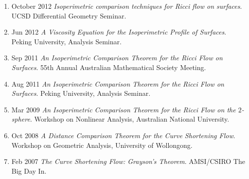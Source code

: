 \documentclass[12pt]{amsart}
\begin{document}
\begin{enumerate}[resume]
\item October 2012 \emph{Isoperimetric comparison techniques for Ricci flow on surfaces}. UCSD Differential Geometry Seminar.
\item Jun 2012 \emph{A Viscosity Equation for the Isoperimetric Profile of Surfaces}. Peking University, Analysis Seminar.
\item Sep 2011 \emph{An Isoperimetric Comparison Theorem for the Ricci Flow on Surfaces}. 55th Annual Australian Mathematical Society Meeting.
\item Aug 2011 \emph{An Isoperimetric Comparison Theorem for the Ricci Flow on Surfaces}. Peking University, Analysis Seminar.
\item Mar 2009 \emph{An Isoperimetric Comparison Theorem for the Ricci Flow on the $2$-sphere}. Workshop on Nonlinear Analysis, Australian National University.
\item Oct 2008 \emph{A Distance Comparison Theorem for the Curve Shortening Flow}. Workshop on Geometric Analysis, University of Wollongong.
\item Feb 2007 \emph{The Curve Shortening Flow: Grayson's Theorem}. AMSI/CSIRO The Big Day In.
\end{enumerate}
\end{document}
